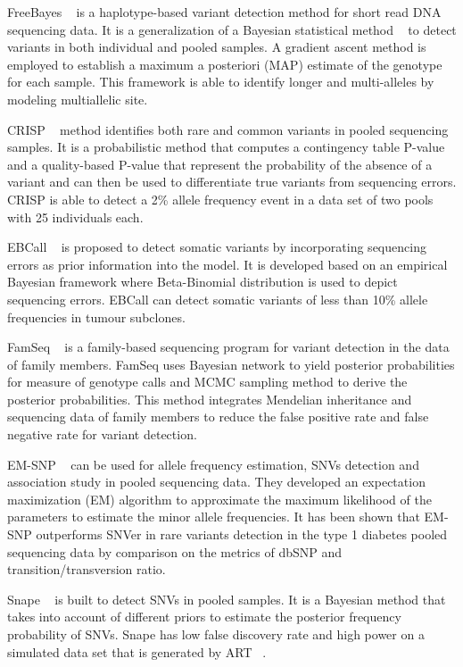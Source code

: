 \documentclass[11pt,reqno]{amsart}
\begin{document}
FreeBayes ~\citep{Garrison2012} is a haplotype-based variant detection method for short read DNA sequencing data.
It is a generalization of a Bayesian statistical method ~\citep{marth1999general} to detect variants in both individual and pooled samples.
A gradient ascent method is employed to establish a maximum a posteriori (MAP) estimate of the genotype for each sample.
This framework is able to identify longer and multi-alleles by modeling multiallelic site.

CRISP ~\citep{Bansal2010} method identifies both rare and common variants in pooled sequencing samples.
It is a probabilistic method that computes a contingency table P-value and a quality-based P-value that represent the probability of the absence of a variant and can then be used to differentiate true variants from sequencing errors.
CRISP is able to detect a 2\% allele frequency event in a data set of two pools with 25 individuals each.

EBCall ~\citep{Shiraishi2013} is proposed to detect somatic variants by incorporating sequencing errors as prior information into the model.
It is developed based on an empirical Bayesian framework where Beta-Binomial distribution is used to depict sequencing errors.
EBCall can detect somatic variants of less than 10\% allele frequencies in tumour subclones.

FamSeq ~\citep{Peng2013} is a family-based sequencing program for variant detection in the data of family members.
FamSeq uses Bayesian network to yield posterior probabilities for measure of genotype calls and MCMC sampling method to derive the posterior probabilities.
This method integrates Mendelian inheritance and sequencing data of family members to reduce the false positive rate and false negative rate for variant detection.

EM-SNP ~\citep{Chen2013} can be used for allele frequency estimation, SNVs detection and association study in pooled sequencing data.
They developed an expectation maximization (EM) algorithm to approximate the maximum likelihood of the parameters to estimate the minor allele frequencies.
It has been shown that EM-SNP outperforms SNVer in rare variants detection in the type 1 diabetes pooled sequencing data by comparison on the metrics of dbSNP and transition/transversion ratio.

Snape ~\citep{Raineri2012} is built to detect SNVs in pooled samples.
It is a Bayesian method that takes into account of different priors to estimate the posterior frequency probability of SNVs.
Snape has low false discovery rate and high power on a simulated data set that is generated by ART ~\citep{huang2012art}.
\end{document}
